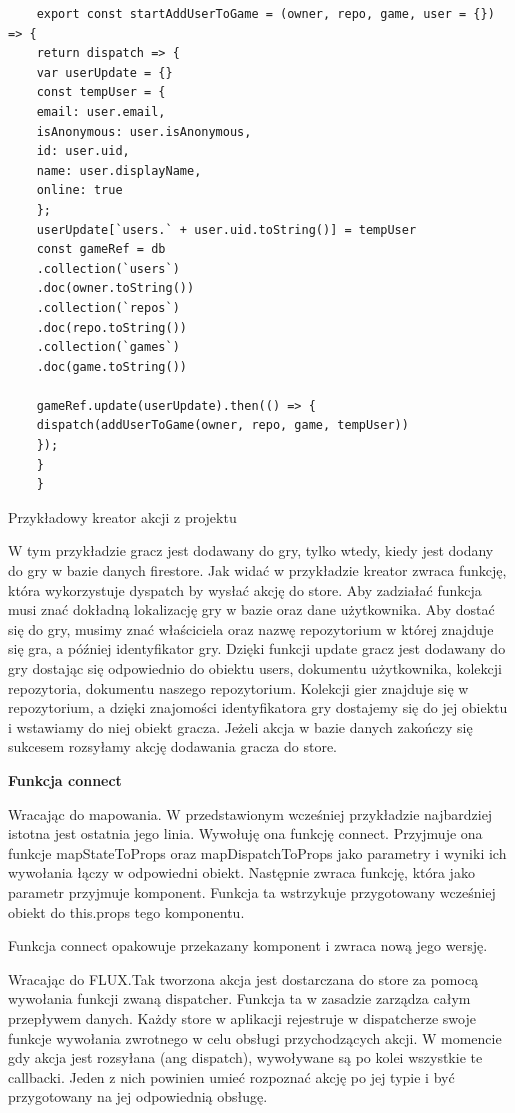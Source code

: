\begin{listing}
	\begin{verbatim}
	export const startAddUserToGame = (owner, repo, game, user = {}) => {
	return dispatch => {
	var userUpdate = {}
	const tempUser = {
	email: user.email,
	isAnonymous: user.isAnonymous,
	id: user.uid,
	name: user.displayName,
	online: true
	};
	userUpdate[`users.` + user.uid.toString()] = tempUser
	const gameRef = db
	.collection(`users`)
	.doc(owner.toString())
	.collection(`repos`)
	.doc(repo.toString())
	.collection(`games`)
	.doc(game.toString())
	
	gameRef.update(userUpdate).then(() => {
	dispatch(addUserToGame(owner, repo, game, tempUser))
	});
	}
	}
	\end{verbatim}
	\caption{Przykładowy kreator akcji z projektu} \label{listing:firebase_action}
\end{listing}

W tym przykładzie gracz jest dodawany do gry, tylko wtedy,
kiedy jest dodany do gry w bazie danych firestore.
Jak widać w przykładzie kreator zwraca funkcję,
która wykorzystuje dyspatch by wysłać akcję do store.
Aby zadziałać funkcja musi znać dokładną lokalizację gry w bazie oraz dane użytkownika.
Aby dostać się do gry, musimy znać właściciela oraz nazwę repozytorium w której znajduje się gra,
a później identyfikator gry.
Dzięki funkcji update gracz jest dodawany do gry dostając się odpowiednio do obiektu users,
dokumentu użytkownika, kolekcji repozytoria, dokumentu naszego repozytorium.
Kolekcji gier znajduje się w repozytorium, a dzięki znajomości identyfikatora gry dostajemy się do jej obiektu i wstawiamy do niej obiekt gracza.
Jeżeli akcja w bazie danych zakończy się sukcesem rozsyłamy akcję dodawania gracza do store.
\begin{center}
	\textbf{Funkcja connect}
\end{center}
Wracając do mapowania. W przedstawionym wcześniej przykładzie najbardziej istotna jest ostatnia jego linia.
Wywołuję ona funkcję connect.
Przyjmuje ona funkcje mapStateToProps oraz mapDispatchToProps jako parametry i wyniki ich wywołania łączy w odpowiedni obiekt.
Następnie zwraca funkcję, która jako parametr przyjmuje komponent. Funkcja ta wstrzykuje przygotowany wcześniej obiekt do this.props tego komponentu.

Funkcja connect opakowuje przekazany komponent i zwraca nową jego wersję.

Wracając do FLUX.\@ Tak tworzona akcja jest dostarczana do store za pomocą wywołania funkcji zwaną dispatcher.
Funkcja ta w zasadzie zarządza całym przepływem danych.
Każdy store w aplikacji rejestruje w dispatcherze swoje funkcje wywołania zwrotnego w celu obsługi przychodzących akcji.
W momencie gdy akcja jest rozsyłana (ang dispatch), wywoływane są po kolei wszystkie te callbacki.
Jeden z nich powinien umieć rozpoznać akcję po jej typie i być przygotowany na jej odpowiednią obsługę.

